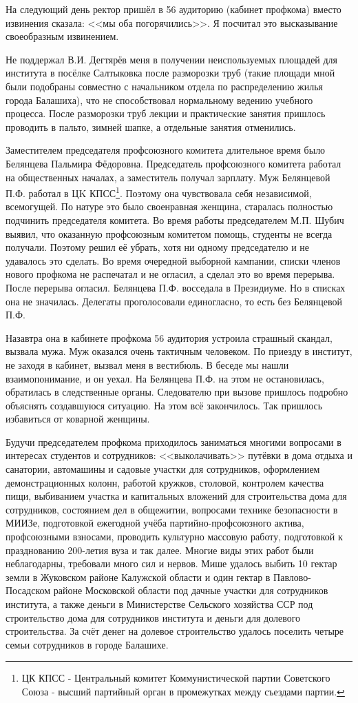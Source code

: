 На следующий день ректор пришёл в 56 аудиторию (кабинет профкома) вместо извинения сказала: <<мы оба погорячились>>. Я посчитал это высказывание своеобразным извинением.

Не поддержал В.И. Дегтярёв меня в получении неиспользуемых площадей для института в посёлке Салтыковка после разморозки труб (такие площади мной были подобраны совместно с начальником отдела по распределению жилья города Балашиха), что не способствовал нормальному ведению учебного процесса. После разморозки труб лекции и практические занятия пришлось проводить в пальто, зимней шапке, а отдельные занятия отменились.

Заместителем председателя профсоюзного комитета длительное время было Белянцева Пальмира Фёдоровна. Председатель профсоюзного комитета работал на общественных началах, а заместитель получал зарплату. Муж Белянцевой П.Ф. работал в ЦK КПСС\footnote{ЦК КПСС - Центральный комитет Коммунистической партии Советского Союза - высший партийный орган в промежутках между съездами партии.}. Поэтому она чувствовала себя независимой, всемогущей. По натуре это было своенравная женщина, старалась полностью подчинить председателя комитета. Во время работы председателем М.П. Шубич выявил, что оказанную профсоюзным комитетом помощь, студенты не всегда получали. Поэтому решил её убрать, хотя ни одному председателю и не удавалось это сделать. Во время очередной выборной кампании, списки членов нового профкома не распечатал и не огласил, а сделал это во время перерыва. После перерыва огласил. Белянцева П.Ф. восседала в Президиуме. Но в списках она не значилась. Делегаты проголосовали единогласно, то есть без Белянцевой П.Ф. 

Назавтра она в кабинете профкома 56 аудитория устроила страшный скандал, вызвала мужа. Муж оказался очень тактичным человеком. По приезду в институт, не заходя в кабинет, вызвал меня в вестибюль. В беседе мы нашли взаимопонимание, и он уехал. На Белянцева П.Ф. на этом не остановилась, обратилась в следственные органы. Следователю при вызове пришлось подробно объяснять создавшуюся ситуацию. На этом всё закончилось. Так пришлось избавиться от коварной женщины. 

Будучи председателем профкома приходилось заниматься многими вопросами в интересах студентов и сотрудников: <<выколачивать>> путёвки в дома отдыха и санатории, автомашины и садовые участки для сотрудников, оформлением демонстрационных колонн, работой кружков, столовой, контролем качества пищи, выбиванием участка и капитальных вложений для строительства дома для сотрудников, состоянием дел в общежитии, вопросами технике безопасности в МИИЗе, подготовкой ежегодной учёба партийно-профсоюзного актива, профсоюзными взносами, проводить культурно массовую работу, подготовкой к празднованию 200-летия вуза и так далее. Многие виды этих работ были неблагодарны, требовали много сил и нервов. Мише удалось выбить 10 гектар земли в Жуковском районе Калужской области и один гектар в Павлово-Посадском районе Московской области под дачные участки для сотрудников института, а также деньги в Министерстве Сельского хозяйства ССР под строительство дома для сотрудников института и деньги для долевого строительства. За счёт денег на долевое строительство удалось поселить четыре семьи сотрудников в городе Балашихе.

